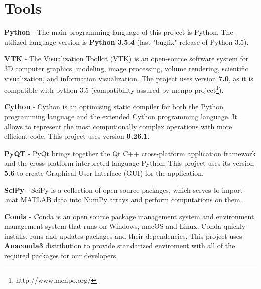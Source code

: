 \section{Tools}

\textbf{Python} - The main programming language of this project is Python. The utilized language version is \textbf{Python 3.5.4} (last "bugfix" release of Python 3.5).

\textbf{VTK} - The Visualization Toolkit (VTK) is an open-source software system for 3D computer graphics, modeling, image processing, volume rendering, scientific visualization, and information visualization.
The project uses version \textbf{7.0}, as it is compatible with python 3.5 (compatibility assured by menpo project\footnote{http://www.menpo.org/}).

\textbf{Cython} - Cython is an optimising static compiler for both the Python programming language and the extended Cython programming language. It allows to represent the most computionally complex operations with more efficient code. This project uses version \textbf{0.26.1}.

\textbf{PyQT} - PyQt brings together the Qt C++ cross-platform application framework and the cross-platform interpreted language Python. This project uses its version \textbf{5.6} to create Graphical User Interface (GUI) for the application.

\textbf{SciPy} - SciPy is a collection of open source packages, which serves to import .mat MATLAB data into NumPy arrays and perform computations on them.

\textbf{Conda} - Conda is an open source package management system and environment management system that runs on Windows, macOS and Linux. Conda quickly installs, runs and updates packages and their dependencies. This project uses \textbf{Anaconda3} distribution to provide standarized enviroment with all of the required packages for our developers.